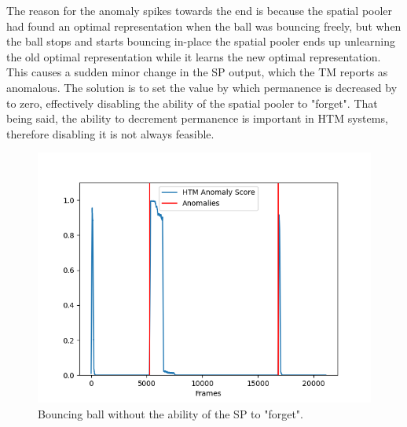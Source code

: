 The reason for the anomaly spikes towards the end is because the spatial pooler had found an optimal representation when the ball was bouncing freely, but when the ball stops and starts bouncing in-place the spatial pooler ends up unlearning the old optimal representation while it learns the new optimal representation. This causes a sudden minor change in the SP output, which the TM reports as anomalous. The solution is to set the value by which permanence is decreased by to zero, effectively disabling the ability of the spatial pooler to "forget". That being said, the ability to decrement permanence is important in HTM systems, therefore disabling it is not always feasible.
\begin{figure}[H]
    \centering
    \includegraphics[width=\textwidth]{resources/experiments/bouncing_ball/bb_anoms_unforgetting.png}
    \caption{Bouncing ball without the ability of the SP to "forget".}
\end{figure}

